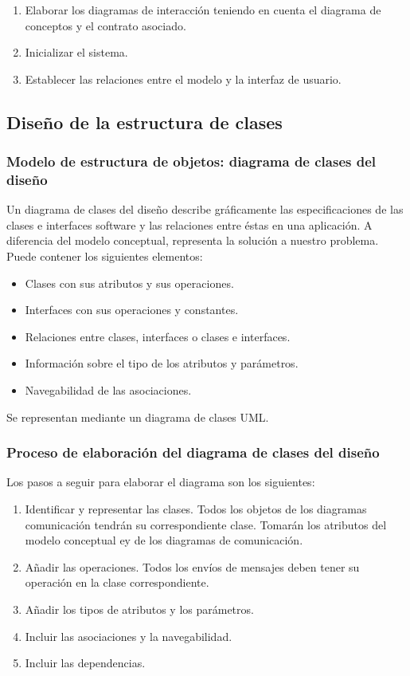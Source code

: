 \documentclass[12pt,spanish]{article}
\begin{document}
\begin{enumerate}
	\item Elaborar los diagramas de interacción teniendo en cuenta el diagrama de conceptos y el contrato asociado.
	\item Inicializar el sistema.
	\item Establecer las relaciones entre el modelo y la interfaz de usuario.
\end{enumerate}



\subsection{Diseño de la estructura de clases}


\subsubsection{Modelo de estructura de objetos: diagrama de clases del diseño}

Un diagrama de clases del diseño describe gráficamente las especificaciones de las clases e interfaces software y las relaciones entre éstas en una aplicación. A diferencia del modelo conceptual, representa la solución a nuestro problema. Puede contener los siguientes elementos:
\begin{itemize}
	\item Clases con sus atributos y sus operaciones.
	\item Interfaces con sus operaciones y constantes.
	\item Relaciones entre clases, interfaces o clases e interfaces.
	\item Información sobre el tipo de los atributos y parámetros.
	\item Navegabilidad de las asociaciones.
\end{itemize}

Se representan mediante un diagrama de clases UML.\\

\subsubsection{Proceso de elaboración del diagrama de clases del diseño}

Los pasos a seguir para elaborar el diagrama son los siguientes:

\begin{enumerate}
	\item Identificar y representar las clases. Todos los objetos de los diagramas comunicación tendrán su correspondiente clase. Tomarán los atributos del modelo conceptual ey de los diagramas de comunicación.
	\item Añadir las operaciones. Todos los envíos de mensajes deben tener su operación en la clase correspondiente.
	\item Añadir los tipos de atributos y los parámetros.
	\item Incluir las asociaciones y la navegabilidad.
	\item Incluir las dependencias.
\end{enumerate}
\end{document}
